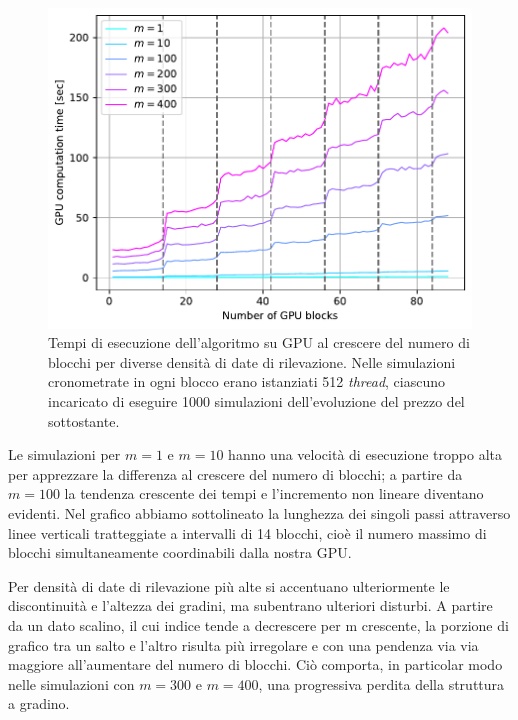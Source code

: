 \begin{figure}[t]
    \centering
    \includegraphics[scale=0.5]{graphs/ComputationTime_Tesla_GPUTimeVsNOfBlocks_VariousM_1000SimsPerThread.pdf}
    \caption[Tempi di esecuzione dell'algoritmo su GPU al crescere del numero di blocchi per diverse densità di date di rilevazione.]{Tempi di esecuzione dell'algoritmo su GPU al crescere del numero di blocchi per diverse densità di date di rilevazione. Nelle simulazioni cronometrate in ogni blocco erano istanziati 512 \textit{thread}, ciascuno incaricato di eseguire 1000 simulazioni dell'evoluzione del prezzo del sottostante.}
    \label{fig:gpucomptime}
\end{figure}


Le simulazioni per $m=1$ e $m=10$ hanno una velocità di esecuzione troppo alta per apprezzare la differenza al crescere del numero di blocchi; a partire da $m=100$ la tendenza crescente dei tempi e l'incremento non lineare diventano evidenti. Nel grafico abbiamo sottolineato la lunghezza dei singoli passi attraverso linee verticali tratteggiate a intervalli di 14 blocchi, cioè il numero massimo di blocchi simultaneamente coordinabili dalla nostra GPU. 

Per densità di date di rilevazione più alte si accentuano ulteriormente le discontinuità e l'altezza dei gradini, ma subentrano ulteriori disturbi. A partire da un dato scalino, il cui indice tende a decrescere per m crescente, la porzione di grafico tra un salto e l'altro risulta più irregolare e con una pendenza via via maggiore all'aumentare del numero di blocchi. Ciò comporta, in particolar modo nelle simulazioni con $m=300$ e $m=400$, una progressiva perdita della struttura a gradino. 

